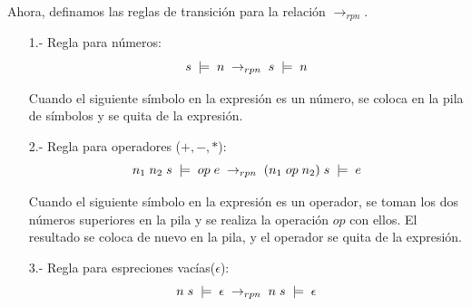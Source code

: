 \documentclass{article}
\begin{document}
\begin{enumerate}
\begin{itemize}
            Ahora, definamos las reglas de transición para la relación $\rightarrow_{rpn}$.\\

            \begin{enumerate}
                \item[1.-] Regla para números:\\
                $$s\hspace{0.1cm}\models\hspace{0.1cm}n\hspace{0.1cm}\rightarrow_{rpn}\hspace{0.1cm}s\hspace{0.1cm}\models\hspace{0.1cm}n$$

                Cuando el siguiente símbolo en la expresión es un número, se coloca en la pila de símbolos y se quita de la expresión.\\

                \item[2.-] Regla para operadores ($+,-,*$):\\

                $$n_1\hspace{0.1cm}n_2\hspace{0.1cm}s\hspace{0.1cm}\models\hspace{0.1cm}op\hspace{0.1cm}e\hspace{0.1cm}\rightarrow_{rpn}\hspace{0.1cm}(n_1\hspace{0.1cm}op\hspace{0.1cm}n_2)\hspace{0.1cm}s\hspace{0.1cm}\models\hspace{0.1cm}e$$

                Cuando el siguiente símbolo en la expresión es un operador, se toman los dos números superiores en la pila y se realiza la operación $op$ con ellos. El resultado se coloca de nuevo en la pila, y el operador se quita de la expresión.\\

                \item[3.-] Regla para espreciones vacías($\epsilon$):\\

                $$n\hspace{0.1cm}s\hspace{0.1cm}\models\hspace{0.1cm}\epsilon\hspace{0.1cm}\rightarrow_{rpn}\hspace{0.1cm}n\hspace{0.1cm}s\hspace{0.1cm}\models\hspace{0.1cm}\epsilon$$
                

\end{enumerate}
\end{itemize}
\end{enumerate}
\end{document}
